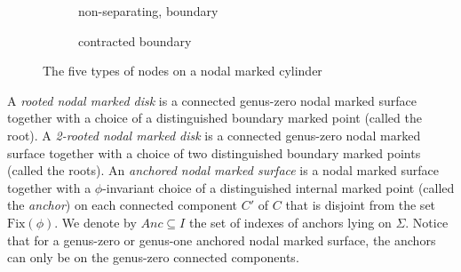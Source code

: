 \documentclass[11pt]{amsart}
\theoremstyle{definition}
\theoremstyle{remark}
\newcommand{\<}{\left<}
\renewcommand{\>}{\right>}
\numberwithin{equation}{section}
\begin{document}
\begin{figure}[h]
\begin{subfigure}{.3\textwidth}
\vspace{0.15cm}

  \caption{non-separating, boundary}
\end{subfigure}
\begin{subfigure}{.3\textwidth}
  \centering

\vspace{0.15cm}

  \caption{contracted boundary }
\end{subfigure}





\caption{The five types of nodes on a nodal marked cylinder}
\label{fig node type}
\end{figure}

A %
\textit{rooted nodal marked disk} is a connected genus-zero nodal marked surface together with a choice of a distinguished boundary marked point (called the root). A \textit{2-rooted nodal marked disk} is a connected genus-zero nodal marked surface together with a choice of two distinguished boundary marked points (called the roots). An \textit{anchored nodal marked surface} is a nodal marked surface together with a $\phi$-invariant choice of a distinguished internal marked point (called the \textit{anchor}) on each connected component $C'$ of $C$ that is disjoint from the set $\text{Fix}(\phi)$. We denote by $Anc\subseteq I$ the set of indexes of anchors lying on $\Sigma$. Notice that for a genus-zero or genus-one anchored nodal marked surface, the anchors can only be on the genus-zero connected components.
\end{document}
